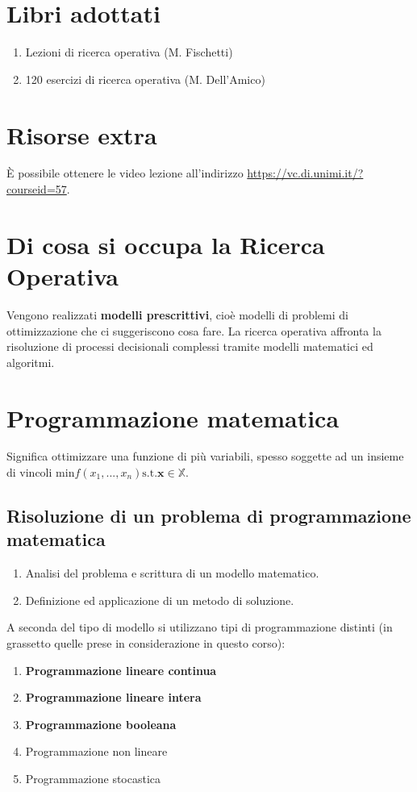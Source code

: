 \documentclass[\main/main.tex]{subfiles}
\begin{document}
\section{Libri adottati}
\begin{enumerate} 
\item Lezioni di ricerca operativa (M. Fischetti)
\item 120 esercizi di ricerca operativa (M. Dell'Amico)
\end{enumerate}

\section{Risorse extra}
È possibile ottenere le video lezione all'indirizzo \url{https://vc.di.unimi.it/?courseid=57}.

\section{Di cosa si occupa la Ricerca Operativa}
Vengono realizzati \textbf{modelli prescrittivi}, cioè modelli di problemi di ottimizzazione che ci suggeriscono cosa fare. La ricerca operativa affronta la risoluzione di processi decisionali complessi tramite modelli matematici ed algoritmi.

\section{Programmazione matematica}
Significa ottimizzare una funzione di più variabili, spesso soggette ad un insieme di vincoli $\text{min} f(x_1,..., x_n) \text{s.t.} \bm{x} \in \mathbb{X}$.

\subsection{Risoluzione di un problema di programmazione matematica}

\begin{enumerate}
\item Analisi del problema e scrittura di un modello matematico.
\item Definizione ed applicazione di un metodo di soluzione.
\end{enumerate}

A seconda del tipo di modello si utilizzano tipi di programmazione distinti (in grassetto quelle prese in considerazione in questo corso):

\begin{enumerate}
\item \textbf{Programmazione lineare continua}
\item \textbf{Programmazione lineare intera}
\item \textbf{Programmazione booleana}
\item Programmazione non lineare
\item Programmazione stocastica
\end{enumerate}
\end{document}
